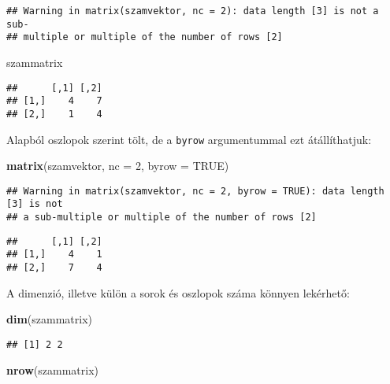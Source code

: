 \documentclass[]{book}
\newenvironment{Shaded}{\begin{snugshade}}{\end{snugshade}}
\newcommand{\KeywordTok}[1]{\textcolor[rgb]{0.13,0.29,0.53}{\textbf{#1}}}
\newcommand{\DataTypeTok}[1]{\textcolor[rgb]{0.13,0.29,0.53}{#1}}
\newcommand{\DecValTok}[1]{\textcolor[rgb]{0.00,0.00,0.81}{#1}}
\newcommand{\OtherTok}[1]{\textcolor[rgb]{0.56,0.35,0.01}{#1}}
\newcommand{\NormalTok}[1]{#1}
\begin{document}
\begin{verbatim}
## Warning in matrix(szamvektor, nc = 2): data length [3] is not a sub-
## multiple or multiple of the number of rows [2]
\end{verbatim}

\begin{Shaded}
\begin{Highlighting}[]
\NormalTok{szammatrix}
\end{Highlighting}
\end{Shaded}

\begin{verbatim}
##      [,1] [,2]
## [1,]    4    7
## [2,]    1    4
\end{verbatim}

Alapból oszlopok szerint tölt, de a \texttt{byrow} argumentummal ezt
átállíthatjuk:

\begin{Shaded}
\begin{Highlighting}[]
\KeywordTok{matrix}\NormalTok{(szamvektor, }\DataTypeTok{nc =} \DecValTok{2}\NormalTok{, }\DataTypeTok{byrow =} \OtherTok{TRUE}\NormalTok{)}
\end{Highlighting}
\end{Shaded}

\begin{verbatim}
## Warning in matrix(szamvektor, nc = 2, byrow = TRUE): data length [3] is not
## a sub-multiple or multiple of the number of rows [2]
\end{verbatim}

\begin{verbatim}
##      [,1] [,2]
## [1,]    4    1
## [2,]    7    4
\end{verbatim}

A dimenzió, illetve külön a sorok és oszlopok száma könnyen lekérhető:

\begin{Shaded}
\begin{Highlighting}[]
\KeywordTok{dim}\NormalTok{(szammatrix)}
\end{Highlighting}
\end{Shaded}

\begin{verbatim}
## [1] 2 2
\end{verbatim}

\begin{Shaded}
\begin{Highlighting}[]
\KeywordTok{nrow}\NormalTok{(szammatrix)}
\end{Highlighting}
\end{Shaded}
\end{document}
